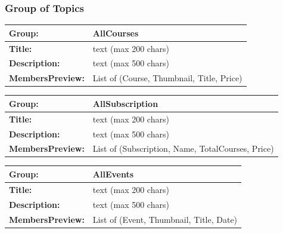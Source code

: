 \documentclass{article}
\begin{document}
\subsubsection{Group of Topics}
\begin{center}
        \begin{tabularx}{\textwidth}{|>{\bfseries}l|X|}
                \hline
                Group: & \textbf{AllCourses} \\
                \hline
                Title: & text  (max 200 chars)\\
                \hline
                Description: & text (max 500 chars) \\
                \hline
                MembersPreview: & List of {(Course, Thumbnail, Title, Price)} \\
                \hline

        \end{tabularx}
        \caption{Table: All Courses }
\end{center}

\begin{center}
        \begin{tabularx}{\textwidth}{|>{\bfseries}l|X|}
                \hline
                Group: & \textbf{AllSubscription} \\
                \hline
                Title: & text  (max 200 chars)\\
                \hline
                Description: & text (max 500 chars) \\
                \hline
                MembersPreview: & List of {(Subscription, Name, TotalCourses, Price)} \\
                \hline

        \end{tabularx}
        \caption{Table: All Subscriptions }
\end{center}

\begin{center}
        \begin{tabularx}{\textwidth}{|>{\bfseries}l|X|}
                \hline
                Group: & \textbf{AllEvents} \\
                \hline
                Title: & text  (max 200 chars)\\
                \hline
                Description: & text (max 500 chars) \\
                \hline
                MembersPreview: & List of {(Event, Thumbnail, Title, Date)} \\
                \hline

        \end{tabularx}
        \caption{Table: All Events }
\end{center}
\end{document}
